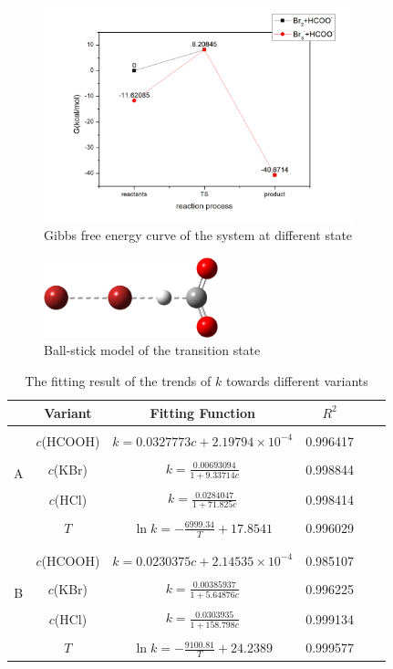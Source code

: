 \documentclass[%
preprint,
 amsmath,amssymb,
 aps,
10.5pt,
]{revtex4-1}
\begin{document}
\begin{figure}
\centering
\includegraphics[width=0.8\textwidth]{figures/process-G.jpg}
\caption{Gibbs free energy curve of the system at different state}
\label{GCurve}
\end{figure}
\begin{figure}
\centering
\includegraphics[width=0.45\textwidth]{figures/TS1-white.png}
\caption{Ball-stick model of the transition state}
\end{figure}
\begin{table}
\centering
\caption{The fitting result of the trends of $k$ towards different variants}
\begin{tabular}{c|ccccc}\hline
& Variant & Fitting Function & $R^2$ \\\hline\\[-1em]
\multirow{6}{*}{A} & $c$(HCOOH) & $k = 0.0327773 c + 2.19794 \times 10^{-4}$ &  0.996417 \\\\[-1em]
& $c$(KBr) & $k= \frac{0.00693094}{1+9.33714 c}$ & 0.998844 \\\\[-1em]
& $c$(HCl) & $k = \frac{0.0284047}{1+ 71.825 c}$ & 0.998414 \\\\[-1em]
& $T$ & $\ln k = - \frac{6999.34}{T} + 17.8541$ & 0.996029	\\\\[-1em]\hline\\[-1em]
\multirow{6}{*}{B} & $c$(HCOOH) & $k = 0.0230375 c + 2.14535 \times 10^{-4}$ & 0.985107 \\\\[-1em]
& $c$(KBr) & $k= \frac{0.00385937}{1+5.64876 c}$ & 0.996225 \\\\[-1em]
& $c$(HCl) & $k = \frac{0.0303935}{1+ 158.798 c}$ & 0.999134 \\\\[-1em]
& $T$ & $\ln k = - \frac{9100.81}{T} + 24.2389$ & 0.999577	\\\hline
\end{tabular}
\end{table}
\end{document}

